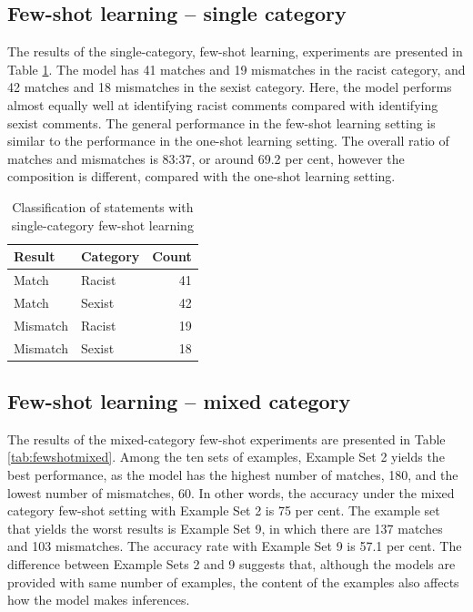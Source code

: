 \documentclass[12pt,]{article}
\begin{document}
\hypertarget{few-shot-learning-single-category}{%
\subsection{Few-shot learning -- single category}\label{few-shot-learning-single-category}}

The results of the single-category, few-shot learning, experiments are presented in Table \ref{tab:fewshotsingle}. The model has 41 matches and 19 mismatches in the racist category, and 42 matches and 18 mismatches in the sexist category. Here, the model performs almost equally well at identifying racist comments compared with identifying sexist comments. The general performance in the few-shot learning setting is similar to the performance in the one-shot learning setting. The overall ratio of matches and mismatches is 83:37, or around 69.2 per cent, however the composition is different, compared with the one-shot learning setting.

\begin{table}

\caption{\label{tab:fewshotsingle}Classification of statements with single-category few-shot learning}
\centering
\begin{tabular}[t]{llr}
\toprule
Result & Category & Count\\
\midrule
Match & Racist & 41\\
Match & Sexist & 42\\
Mismatch & Racist & 19\\
Mismatch & Sexist & 18\\
\bottomrule
\end{tabular}
\end{table}

\hypertarget{few-shot-learning-mixed-category}{%
\subsection{Few-shot learning -- mixed category}\label{few-shot-learning-mixed-category}}

The results of the mixed-category few-shot experiments are presented in Table \ref{tab:fewshotmixed}. Among the ten sets of examples, Example Set 2 yields the best performance, as the model has the highest number of matches, 180, and the lowest number of mismatches, 60. In other words, the accuracy under the mixed category few-shot setting with Example Set 2 is 75 per cent. The example set that yields the worst results is Example Set 9, in which there are 137 matches and 103 mismatches. The accuracy rate with Example Set 9 is 57.1 per cent. The difference between Example Sets 2 and 9 suggests that, although the models are provided with same number of examples, the content of the examples also affects how the model makes inferences.
\end{document}

